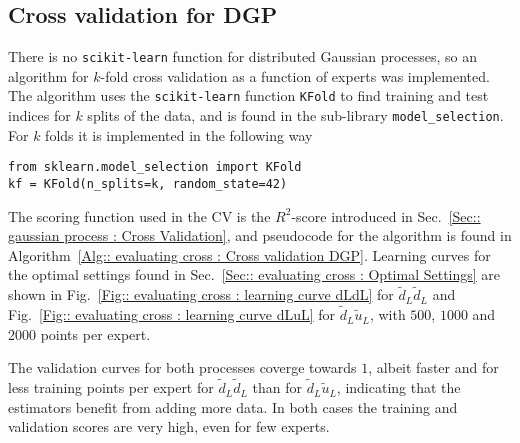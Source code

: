 \documentclass[twoside,english]{uiofysmaster}
\begin{document}

\subsection{Cross validation for DGP}

There is no \verb|scikit-learn| function for distributed Gaussian processes, so an algorithm for $k$-fold cross validation as a function of experts was implemented. The algorithm uses the \verb|scikit-learn| function \verb|KFold| to find training and test indices for $k$ splits of the data, and is found in the sub-library \verb|model_selection|. For $k$ folds it is implemented in the following way
\begin{lstlisting}
from sklearn.model_selection import KFold
kf = KFold(n_splits=k, random_state=42)
\end{lstlisting}
The scoring function used in the CV is the $R^2$-score introduced in Sec.~\ref{Sec:: gaussian process : Cross Validation}, and pseudocode for the algorithm is found in Algorithm~\ref{Alg:: evaluating cross : Cross validation DGP}. Learning curves for the optimal settings found in Sec.~\ref{Sec:: evaluating cross : Optimal Settings} are shown in Fig.~\ref{Fig:: evaluating cross : learning curve dLdL} for $\tilde{d}_L \tilde{d}_L$ and Fig.~\ref{Fig:: evaluating cross : learning curve dLuL} for $\tilde{d}_L \tilde{u}_L$, with $500$, $1000$ and $2000$ points per expert.

The validation curves for both processes coverge towards $1$, albeit faster and for less training points per expert for $\tilde{d}_L \tilde{d}_L$ than for $\tilde{d}_L \tilde{u}_L$, indicating that the estimators benefit from adding more data. In both cases the training and validation scores are very high, even for few experts.
\end{document}
